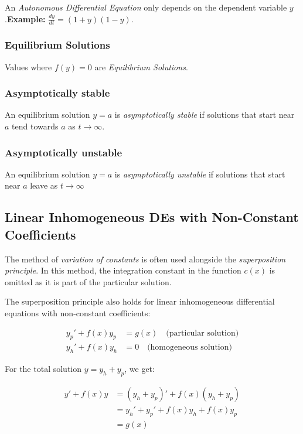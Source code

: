 An \emph{Autonomous Differential Equation} only depends on the dependent
variable \(y\).\textbf{Example: } \(\frac{dy}{dt} = (1 + y)(1 -y)\).

\subsubsection{Equilibrium Solutions}
Values where \(f(y) = 0\) are \emph{Equilibrium Solutions}.

\subsubsection*{Asymptotically stable}
An equilibrium solution \(y = a\) is \emph{asymptotically stable} if solutions
that start near \(a\) tend towards \(a\) as \(t \to \infty\).

\subsubsection*{Asymptotically unstable}
An equilibrium solution \(y = a\) is \emph{asymptotically unstable} if solutions
that start near \(a\) leave as \(t \to \infty\)


\subsection{Linear Inhomogeneous DEs with Non-Constant Coefficients}

The method of \emph{variation of constants} is often used alongside the \emph{superposition principle}. In this method, the integration constant in the function \( c(x) \) is omitted as it is part of the particular solution.
\vspace{\baselineskip}

The superposition principle also holds for linear inhomogeneous differential equations with non-constant coefficients:

\begin{align*}
y_p' + f(x)y_p &= g(x) \quad \text{(particular solution)} \\
y_h' + f(x)y_h &= 0 \quad \text{(homogeneous solution)}
\end{align*}

For the total solution \( y = y_h + y_p \), we get:

\begin{align*}
y' + f(x)y 
&= (y_h + y_p)' + f(x)(y_h + y_p) \\
&= y_h' + y_p' + f(x)y_h + f(x)y_p \\
&= g(x)
\end{align*}


